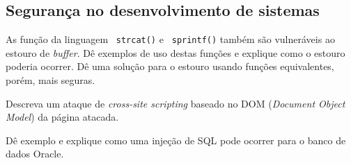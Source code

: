 \subsection*{Segurança no desenvolvimento de sistemas}

\exercise As função da linguagem \CEE\ {\tt strcat()} e {\tt
  sprintf()} também são vulneráveis ao estouro de {\em buffer}. Dê
exemplos de uso destas funções e explique como o estouro poderia
ocorrer. Dê uma solução para o estouro usando funções equivalentes,
porém, mais seguras.

\exercise Descreva um ataque de {\em cross-site scripting} baseado no
DOM ({\em Document Object Model}) da página atacada.

\exercise Dê exemplo e explique como uma injeção de SQL pode ocorrer
para o banco de dados Oracle.